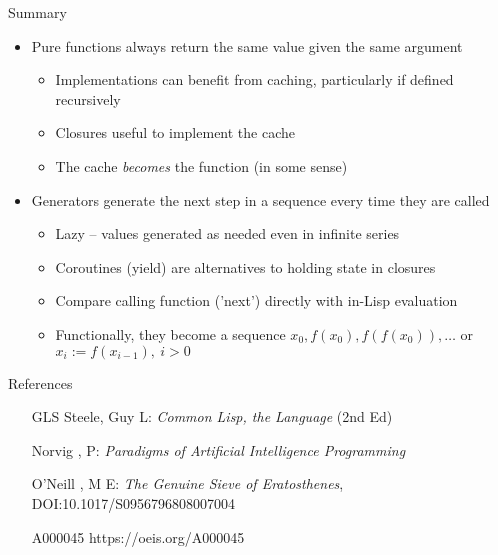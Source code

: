 \documentclass[presentation]{beamer}
\begin{document}
\begin{frame}{Summary}
  \begin{itemize}
  \item Pure functions always return the same value given the same argument
    \begin{itemize}
    \item Implementations can benefit from caching, particularly if defined recursively
    \item Closures useful to implement the cache
    \item The cache \emph{becomes} the function (in some sense)
    \end{itemize}
  \item Generators generate the next step in a sequence every time they are called
    \begin{itemize}
    \item Lazy -- values generated as needed even in infinite series
    \item Coroutines (yield) are alternatives to holding state in closures
    \item Compare calling function ('next') directly with in-Lisp evaluation
    \item Functionally, they become a sequence $x_0,f(x_0),f(f(x_0)),\ldots$ or $x_i:=f(x_{i-1}),\ i>0$
    \end{itemize}
  \end{itemize}
\end{frame}

\begin{frame}{References}
  \begin{itemize}
  \item [GLS] Steele, Guy L: \emph{Common Lisp, the Language} (2nd Ed)
  \item [Norvig], P: \emph{Paradigms of Artificial Intelligence Programming}
  \item [O'Neill], M E: \emph{The Genuine Sieve of Eratosthenes}, DOI:10.1017/S0956796808007004
  \item [A000045] https://oeis.org/A000045
  \end{itemize}
  
\end{frame}
\end{document}

